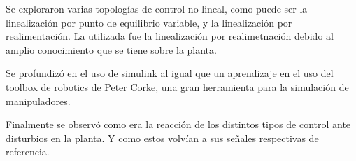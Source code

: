  Se exploraron varias topologías de control no lineal, como puede ser la linealización por punto de equilibrio variable, y la linealización por realimentación. La utilizada fue la linealización por realimetnación debido al amplio conocimiento que se tiene sobre la planta. 

Se profundizó en el uso de simulink  al igual que un aprendizaje en el uso del toolbox de robotics de Peter Corke, una gran herramienta para la simulación de manipuladores. 

Finalmente se observó como era la reacción de los distintos tipos de control ante disturbios en la planta.
Y como estos volvían a sus señales respectivas de referencia.

%


